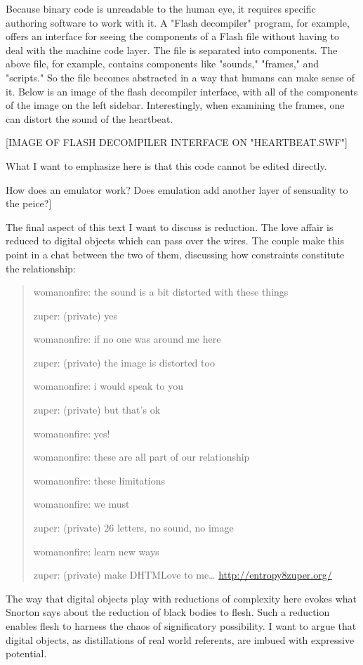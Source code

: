 \documentclass[11pt]{article}
\begin{document}
\begin{enumerate}

Because binary code is unreadable to the human eye, it requires
specific authoring software to work with it. A "Flash decompiler"
program, for example, offers an interface for seeing the components of
a Flash file without having to deal with the machine code layer. The
file is separated into components. The above file, for example,
contains components like "sounds," "frames," and "scripts." So the
file becomes abstracted in a way that humans can make sense of
it. Below is an image of the flash decompiler interface, with all of
the components of the image on the left sidebar. Interestingly, when
examining the frames, one can distort the sound of the heartbeat.

[IMAGE OF FLASH DECOMPILER INTERFACE ON "HEARTBEAT.SWF"]

What I want to emphasize here is that this code cannot be edited
directly. 

How does an emulator work? Does emulation add another layer of
sensuality to the peice?]

The final aspect of this text I want to discuss is reduction. The love
affair is reduced to digital objects which can pass over the
wires. The couple make this point in a chat between the two of them,
discussing how constraints constitute the relationship:
\begin{quote}
womanonfire: the sound is a bit distorted with these things

zuper: (private) yes

womanonfire: if no one was around me here

zuper: (private) the image is distorted too

womanonfire: i would speak to you

zuper: (private) but that's ok

womanonfire: yes!

womanonfire: these are all part of our relationship

womanonfire: these limitations

womanonfire: we must

zuper: (private) 26 letters, no sound, no image

womanonfire: learn new ways

zuper: (private) make DHTMLove to me\ldots{} \url{http://entropy8zuper.org/}
\end{quote}

The way that digital objects play with reductions of complexity here
evokes what Snorton says about the reduction of black bodies to
flesh. Such a reduction enables flesh to harness the chaos of
significatory possibility. I want to argue that digital objects, as
distillations of real world referents, are imbued with expressive
potential.


\end{enumerate}
\end{document}
